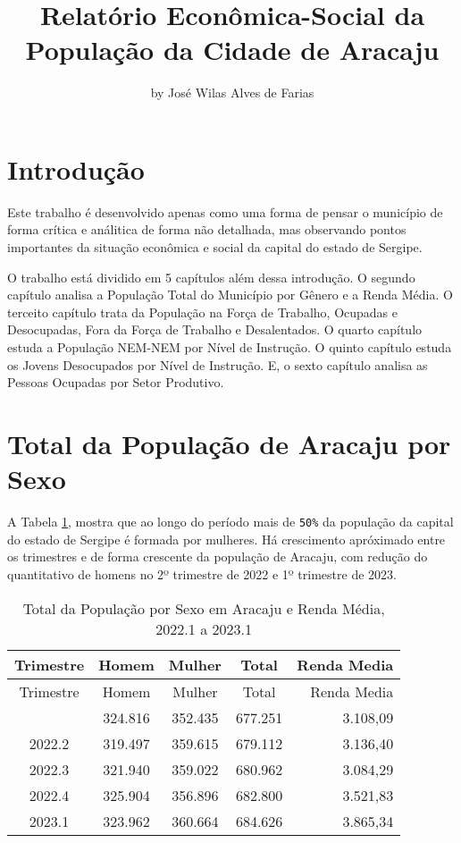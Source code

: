 \title{Relatório Econômica-Social da População da Cidade de Aracaju}
\author{by José Wilas Alves de Farias}

\maketitle


\hypertarget{introduuxe7uxe3o}{%
\section{Introdução}\label{introduuxe7uxe3o}}

Este trabalho é desenvolvido apenas como uma forma de pensar o município
de forma crítica e análitica de forma não detalhada, mas observando
pontos importantes da situação econômica e social da capital do estado
de Sergipe.

O trabalho está dividido em 5 capítulos além dessa introdução. O segundo
capítulo analisa a População Total do Município por Gênero e a Renda
Média. O terceito capítulo trata da População na Força de Trabalho,
Ocupadas e Desocupadas, Fora da Força de Trabalho e Desalentados. O
quarto capítulo estuda a População NEM-NEM por Nível de Instrução. O
quinto capítulo estuda os Jovens Desocupados por Nível de Instrução. E,
o sexto capítulo analisa as Pessoas Ocupadas por Setor Produtivo.

\hypertarget{total-da-populauxe7uxe3o-de-aracaju-por-sexo}{%
\section{Total da População de Aracaju por
Sexo}\label{total-da-populauxe7uxe3o-de-aracaju-por-sexo}}

A Tabela \ref{tab1}, mostra que ao longo do período mais de
\texttt{50\%} da população da capital do estado de Sergipe é formada por
mulheres. Há crescimento apróximado entre os trimestres e de forma
crescente da população de Aracaju, com redução do quantitativo de homens
no 2º trimestre de 2022 e 1º trimestre de 2023.

\begin{longtable}[]{@{}ccccr@{}}
\caption{\label{tab1}Total da População por Sexo em Aracaju e Renda
Média, 2022.1 a 2023.1}\tabularnewline
\toprule\noalign{}
Trimestre & Homem & Mulher & Total & Renda Media \\
\midrule\noalign{}
\endfirsthead
\toprule\noalign{}
Trimestre & Homem & Mulher & Total & Renda Media \\
\midrule\noalign{}
\endhead
\bottomrule\noalign{}
\endlastfoot
2022.1 & 324.816 & 352.435 & 677.251 & 3.108,09 \\
2022.2 & 319.497 & 359.615 & 679.112 & 3.136,40 \\
2022.3 & 321.940 & 359.022 & 680.962 & 3.084,29 \\
2022.4 & 325.904 & 356.896 & 682.800 & 3.521,83 \\
2023.1 & 323.962 & 360.664 & 684.626 & 3.865,34 \\
\end{longtable}

